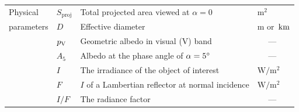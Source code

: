 \begin{table}
\begin{tabular}{llll}
    \hline
    Physical
     & $ S_\mathrm{proj} $      & Total projected area viewed at $ \alpha = 0 $ & $ \mathrm{m^2} $ \\
    parameters
     & $ D $           & Effective diameter                                   & $ \mathrm{m} $ or $ \,\mathrm{km} $\\
     & $ p_\mathrm{V} $         & Geometric albedo in visual (V) band                  & ~~ --- \\
     & $ A_5 $         & Albedo at the phase angle of $ \alpha = 5 ^\circ $    & ~~ --- \\
     & $ I $           & The irradiance of the object of interest             & $ \mathrm{W/m^2} $ \\
     & $ F $           & $ I $ of a Lambertian reflector at normal incidence  & $ \mathrm{W/m^2} $ \\
     & $ I/F $         & The radiance factor                                  & ~~ --- \\
    \hline
  \end{tabular}
\end{table}

